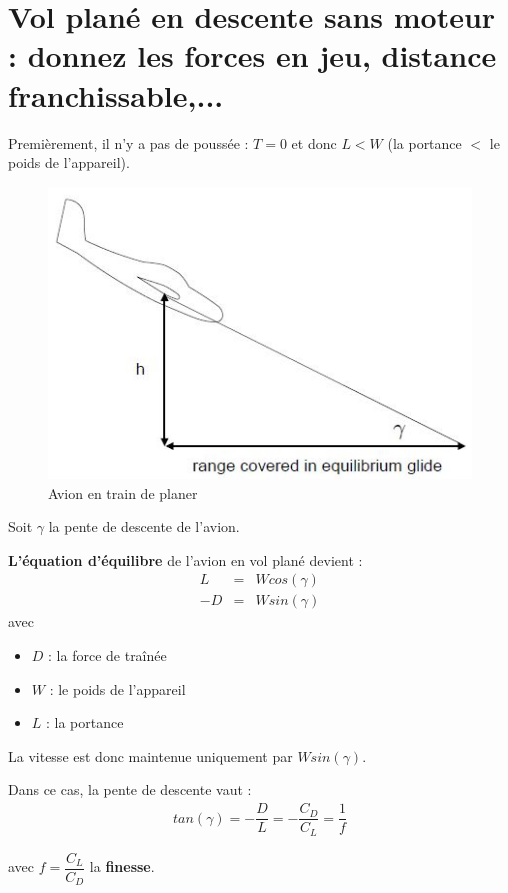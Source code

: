 \documentclass{report}
\begin{document}
 

\section{Vol plané en descente sans moteur : donnez les forces en jeu, distance franchissable,...}

Premièrement, il n'y a pas de poussée : $T=0$ et donc $L<W$ (la portance $<$ le poids de l'appareil).

\begin{figure}[h!]
    \centering
    \includegraphics[scale=0.6]{12.JPG}
    \caption{Avion en train de planer}
    \label{12}
\end{figure}

Soit $\gamma$ la pente de descente de l'avion.

\textbf{L'équation d'équilibre} de l'avion en vol plané devient :
\begin{eqnarray}
L &= &Wcos(\gamma)\\
-D &= &W sin(\gamma)
\end{eqnarray}
avec \begin{itemize}
    \item $D$ : la force de traînée
    \item $W$ : le poids de l'appareil
    \item $L$ : la portance
\end{itemize}

La vitesse est donc maintenue uniquement par $W sin(\gamma)$.

Dans ce cas, la pente de descente vaut :
\begin{eqnarray}
tan(\gamma) = -\dfrac{D}{L} = -\dfrac{C_D}{C_L} = \dfrac{1}{f}
\end{eqnarray}

avec $f=\dfrac{C_L}{C_D}$ la \textbf{finesse}.
\end{document}
